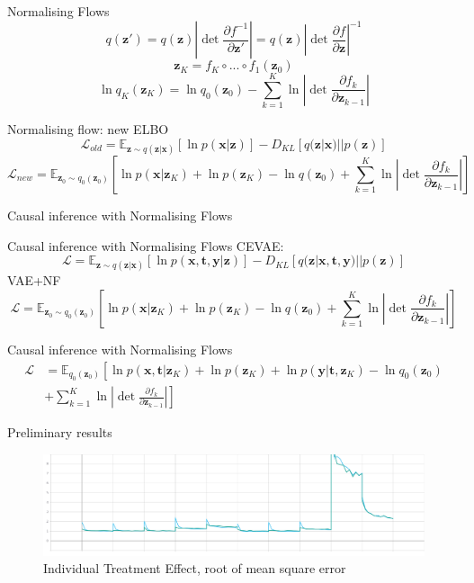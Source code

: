 \documentclass{beamer}
\newcommand{\E}{\mathbb{E}}
\newcommand{\bt}{\mathbf{t}}
\newcommand{\bx}{\mathbf{x}}
\newcommand{\by}{\mathbf{y}}
\newcommand{\bz}{\mathbf{z}}
\newcommand{\parfrac}[2]{\frac{\partial #1}{\partial#2}}
\begin{document}
	\begin{frame}{Normalising Flows}
	    $$q(\bz') = q(\bz)\left| \det \parfrac{f^{-1}}{\bz'} \right| = q(\bz)\left| \det \parfrac{f}{\bz} \right| ^{-1}$$
	    $$\bz_K = f_K  \circ ... \circ f_1(\bz_0)$$
	    $$\ln q_K(\bz_K) = \ln q_0(\bz_0) - \sum\limits^K_{k=1} \ln \left|\det \parfrac{f_k}{\bz_{k-1}} \right| $$ 
	\end{frame}
	
	\begin{frame}{Normalising flow: new ELBO}
	     $$\mathcal{L}_{old} = \E_{\bz \sim q(\bz|\bx)}[\ln p(\bx|\bz)] - D_{KL}[q(\bz|\bx) || p(\bz)]$$
	     $$\mathcal{L}_{new} = \E_{\bz_0 \sim q_0(\bz_0)}[\ln p(\bx| \bz_K) + \ln p(\bz_K) - \ln q(\bz_0) + \sum\limits^K_{k=1}\ln \left|\det \parfrac{f_k}{\bz_{k-1}} \right|]  $$
	\end{frame}
	\begin{frame}{Causal inference with Normalising Flows}
	    \centering
	\end{frame}
	
	\begin{frame}{Causal inference with Normalising Flows}
	    CEVAE:
	    $$ \mathcal{L} = \E_{\bz \sim q(\bz|\bx)}[\ln p(\bx, \bt, \by|\bz)] - D_{KL}[q(\bz|\bx, \bt, \by) || p(\bz)]$$
	    VAE+NF
	    $$\mathcal{L} = \E_{\bz_0 \sim q_0(\bz_0)}[\ln p(\bx| \bz_K) + \ln p(\bz_K) - \ln q(\bz_0) + \sum\limits^K_{k=1}\ln \left|\det \parfrac{f_k}{\bz_{k-1}} \right|]  $$
	\end{frame}
	
	\begin{frame}{Causal inference with Normalising Flows}
	    \begin{equation}\begin{split}
	    \mathcal{L} &= \mathbb{E}_{q_0(\bz_0)}\left[\ln p(\bx, \bt | \bz_K) + \ln p(\bz_K) + \ln p(\by |\bt, \bz_K) - \ln q_0(\bz_0)\right.\\
	    &\left. + \sum\limits^K_{k=1} \ln \left| \det \parfrac{f_k}{\bz_{k-1}}\right| \right]
	    \end{split}\end{equation}
	\end{frame}

    \begin{frame}{Preliminary results}
        \begin{figure}
            \centering
            \includegraphics[scale=0.2]{latex/Figures/Results/metrics_ite.png}
            \caption{Individual Treatment Effect, root of mean square error}
        \end{figure}
    \end{frame}	 
\end{document}
